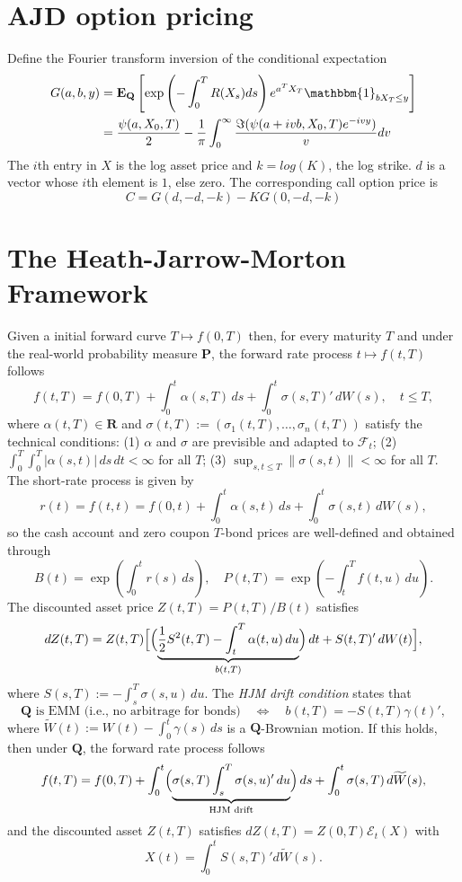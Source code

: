 \documentclass[twocolumn]{amsart}
\renewcommand{\P}{\mathbf{P}}
\newcommand{\Q}{\mathbf{Q}}
\newcommand{\EQ}{\mathbf{E}_\mathbf{Q}}
\newcommand{\F}{\mathcal{F}}
\newcommand{\R}{\mathbf{R}}
\newcommand{\sE}{\mathcal{E}}
\newcommand{\tW}{\widetilde W}
\begin{document}
\section*{AJD option pricing}
Define the Fourier transform inversion of the conditional expectation
\begin{align*}
G(a,b,y) &= \EQ\left[\exp\left(-\int_0^{T}R(X_s)ds\right)e^{a^TX_T}\mathbbm{1}_{bX_T\leq y}\right]\\
&=\frac{\psi(a,X_0,T)}{2}-\frac{1}{\pi}\int_0^{\infty}\frac{\Im(\psi(a+ivb,X_0,T)e^{-ivy})}{v}dv
\end{align*}
The $i$th entry in $X$ is the log asset price and $k=log(K)$, the log strike. $d$ is a vector whose $i$th element is $1$, else zero. The corresponding call option price is
\begin{equation*}
C=G(d,-d,-k)-KG(0,-d,-k)
\end{equation*}
\section*{The Heath-Jarrow-Morton Framework}

Given a initial forward curve $T \mapsto f(0,T)$ then, for every maturity $T$  and under the real-world probability measure $\P$, the forward rate process $t \mapsto f(t,T)$ follows
\begin{equation*}
    f(t,T) = f(0,T) + \int_0^t \alpha(s,T)\,ds + \int_0^t \sigma(s,T)'\,dW(s), \quad t \le T,
\end{equation*}
where $\alpha(t,T) \in \R$ and $\sigma(t,T) := (\sigma_1(t,T), \ldots, \sigma_n(t,T))$ satisfy the technical conditions: (1) $\alpha$ and $\sigma$ are previsible and adapted to $\F_t$; (2) $\int_0^T\int_0^T |\alpha(s,t)|\,ds\,dt < \infty$ for all $T$; (3) $\sup_{s,t \le T} \|\sigma(s,t)\| < \infty$ for all $T$. The short-rate process is given by
\begin{equation*}
    r(t) = f(t,t) = f(0,t) + \int_0^t\alpha(s,t)\,ds + \int_0^t \sigma(s,t)\,dW(s),
\end{equation*}
so the cash account and zero coupon $T$-bond prices are well-defined and obtained through
\[
B(t) = \exp\left(\int_0^tr(s)\,ds\right), \quad P(t,T) = \exp\left(-\int_t^Tf(t,u)\,du\right).
\]
The discounted asset price $Z(t,T) = P(t,T)/B(t)$ satisfies
\[
    dZ(t,T) = Z(t,T)\Bigl[\Bigl(\underbrace{\frac12 S^2(t,T) - \int_t^T \alpha(t,u)\,du}_{b(t,T)}\Bigr)\,dt + S(t,T)'\,dW(t)\Bigr],
\]
where $S(s,T) := - \int_s^T \sigma(s,u)\,du$. The \emph{HJM drift condition} states that
\[
    \text{$\Q$ is EMM (i.e., no arbitrage for bonds)} \quad \iff \quad b(t,T) = -S(t,T) \gamma(t)',
\]
where $\tW(t):= W(t) - \int_0^t\gamma(s)\,ds$ is a $\Q$-Brownian motion. If this holds, then under $\Q$, the forward rate process follows
\[
    f(t,T) = f(0,T) + \int_0^t \Bigl(\underbrace{\sigma(s,T)\int_s^T\sigma(s,u)'\,du}_{\text{HJM drift}} \Bigr)\,ds + \int_0^t \sigma(s,T)\,d\tW(s),
\]
and the discounted asset $Z(t,T)$ satisfies $dZ(t,T) = Z(0,T) \sE_t(X)$ with $$X(t) = \int_0^t S(s,T)'d\tW(s).$$
\end{document}
